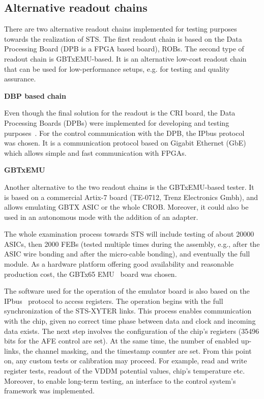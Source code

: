 \subsection{Alternative readout chains}
\label{tester}
There are two alternative readout chains implemented for testing purposes towards the realization of \gls{STS}. The first readout chain is based on the Data Processing Board (\gls{DPB} is a \gls{FPGA} based board), \glspl{ROB}. The second type of readout chain is GBTxEMU-based. It is an alternative low-cost readout chain that can be used for
low-performance setups, e.g. for testing and quality assurance. \bigbreak


\textbf{DBP based chain}\bigbreak


Even though the final solution for the readout is the \gls{CRI} board, the Data Processing Boards (\glspl{DPB}) were implemented for developing and testing purposes~\cite{Loizeau}. For the control communication with the \gls{DPB}, the IPbus protocol~\cite{ipbus} was chosen. It is a communication protocol based on Gigabit Ethernet (GbE) which allows simple and fast communication with \glspl{FPGA}. \bigbreak

\textbf{GBTxEMU} \bigbreak


Another alternative to the two readout chains is the GBTxEMU-based tester. It is based on a commercial Artix-7 board (TE-0712, Trenz Electronics Gmbh), and allows emulating GBTX ASIC or the whole \gls{CROB}. Moreover, it could also be used in an autonomous mode with the addition of an adapter.


The whole examination process towards \gls{STS} will include testing of about 20000 ASICs, then 2000 FEBs (tested  multiple times during the assembly, e.g., after the ASIC wire bonding and after the micro-cable bonding), and eventually the full module. As a hardware platform offering good availability and reasonable production cost, the GBTx65 EMU~\cite{zabolotny1} board was chosen.

The software used for the operation of the emulator board is also based on the IPbus~\cite{ipbus} protocol to access registers.
The operation begins with the full synchronization of the STS-XYTER links. This process enables communication with the chip, given no correct time phase between data and clock and incoming data exists. The next step involves the configuration of the chip's registers (35496 bits for the AFE control are set). At the same time, the number of enabled up-links, the channel masking, and the timestamp counter are set.  From this point on, any custom tests or calibration may proceed. For example, read and write register tests, readout of the VDDM potential values, chip's temperature etc. Moreover, to enable long-term testing, an interface to the control system's framework was implemented.


